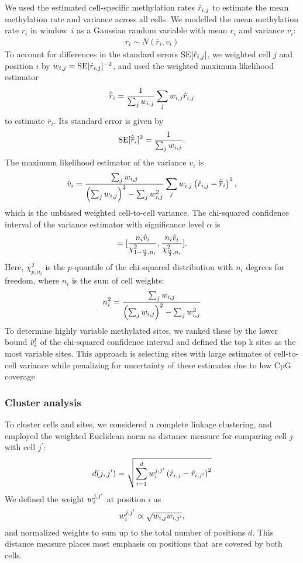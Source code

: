 We used the estimated cell-specific methylation rates $\hat{r}_{i,j}$ to estimate the mean methylation rate and variance across all cells. We modelled the mean methylation rate $r_i$ in window~$i$ as a Gaussian random variable with mean $\overline{r}_i$ and variance $v_i$:
\begin{align}
  r_i \sim N(\overline{r}_i, v_i)
\end{align}
To account for differences in the standard errors $\operatorname{SE}[\hat{r}_{i,j}]$, we weighted cell $j$ and position $i$ by $w_{i,j}=\operatorname{SE}[\hat{r}_{i,j}]^{-2}$, and used the weighted maximum likelihood estimator
\begin{align}
  \hat{\overline{r}}_i = \frac{1}{\sum_j w_{i,j}} \sum_j w_{i,j}\hat{r}_{i,j}
\end{align}
to estimate $\overline{r}_i$. Its standard error is given by
\begin{align}
  \operatorname{SE}[\hat{\overline{r}}_i]^2 = \frac{1}{\sum_j w_{i,j}}.
\end{align}
The maximum likelihood estimator of the variance $v_i$ is
\begin{align} \label{eq:bs_var}
  \hat{v}_i = \frac{\sum_j w_{i,j}}{\left(\sum_j w_{i,j}\right)^2 - \sum_j w_{i,j}^2} \sum_j w_{i,j} \left(\hat{r}_{i,j} - \hat{\overline{r}}_i\right)^2,
\end{align}
which is the unbiased weighted cell-to-cell variance. The chi-squared confidence interval of the variance estimator with significance level $\alpha$ is
\begin{align}
  [\Xrvli, \Xrvui] = [\frac{n_i \Xrvi}{\chi^2_{1-\frac{\alpha}{2}, n_i}},
  \frac{n_i \Xrvi}{\chi^2_{\frac{\alpha}{2}, n_i}}].
\end{align}
Here, $\chi^2_{p, n_i}$ is the $p$-quantile of the chi-squared distribution with $n_i$ degrees for freedom, where $n_i$ is the sum of cell weights:
\begin{align}
  n_i^2 = \frac{\sum_j w_{i,j}}{\left(\sum_j w_{i,j}\right)^2 - \sum_j w_{i,j}^2}
\end{align}
To determine highly variable methylated sites, we ranked these by the lower bound $\hat{v}^l_i$ of the chi-squared confidence interval and defined the top k sites as the most variable sites. This approach is selecting sites with large estimates of cell-to-cell variance while penalizing for uncertainty of these estimates due to low CpG coverage.

\subsubsection{Cluster analysis}

To cluster cells and sites, we considered a complete linkage clustering, and employed the weighted Euclidean norm as distance measure for comparing cell $j$ with cell $j^\prime$:
\begin{align}
  d(j, j^\prime) = \sqrt{\sum_{i=1}^d w^{j,j^\prime}_i \left(\hat{r}_{i,j} - \hat{r}_{i, j^\prime}\right)^2}
\end{align}
We defined the weight $w^{j,j^\prime}_i$ at position $i$ as
\begin{align} \label{eq:bs_clust}
  w^{j,j^\prime}_i \propto \sqrt{w_{i,j}w_{i,j^\prime}},
\end{align}
and normalized weights to sum up to the total number of positions $d$. This distance measure places most emphasis on positions that are covered by both cells.


